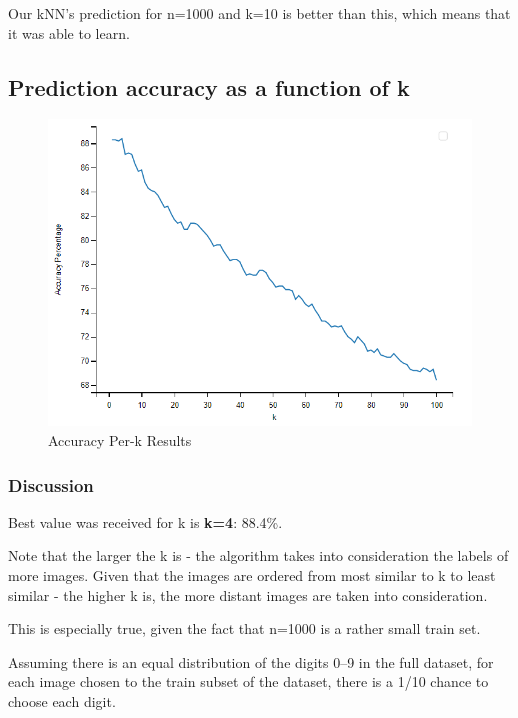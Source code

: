 \documentclass{article}
\begin{document}
    Our kNN's prediction for n=1000 and k=10 is better than this, which means that it was able to learn.

    \subsection{Prediction accuracy as a function of k}\label{subsec:prediction-accuracy-k}

    \begin{figure}[htp]
        \centering
        \includegraphics{images/q_2c}
        \caption{\label{fig:k-results}Accuracy Per-k Results}
    \end{figure}

    \subsubsection{Discussion}

    Best value was received for k is \textbf{k=4}: 88.4\%.

    Note that the larger the k is - the algorithm takes into consideration the labels of more images.
    Given that the images are ordered from most similar to k to least similar - the higher k is, the more distant images are taken into consideration.

    This is especially true, given the fact that n=1000 is a rather small train set.

    Assuming there is an equal distribution of the digits 0--9 in the full dataset, for each image chosen to the train subset of the dataset, there is a 1/10 chance to choose each digit.
\end{document}
